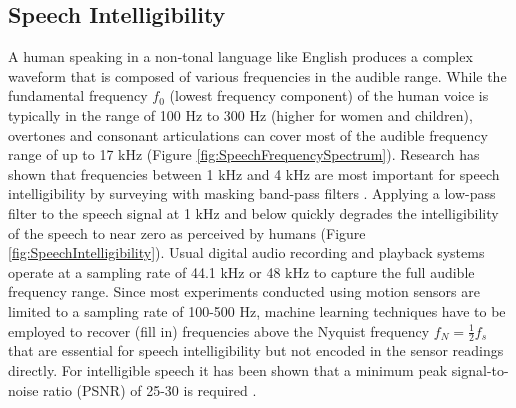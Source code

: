 \documentclass[sigconf, nonacm]{acmart}
\begin{document}
\subsection{Speech Intelligibility}
A human speaking in a non-tonal language like English produces a complex waveform that is composed of various frequencies in the audible range.
While the fundamental frequency $f_0$ (lowest frequency component) of the human voice is typically in the range of 100 Hz to 300 Hz (higher for women and children), overtones and consonant articulations can cover most of the audible frequency range of up to 17 kHz (Figure \ref{fig:SpeechFrequencySpectrum}).
Research has shown that frequencies between 1 kHz and 4 kHz are most important for speech intelligibility by surveying with masking band-pass filters \cite{DPAMicrophonesFactsAboutSpeechIntelligibility}.
Applying a low-pass filter to the speech signal at 1 kHz and below quickly degrades the intelligibility of the speech to near zero as perceived by humans (Figure \ref{fig:SpeechIntelligibility}).
Usual digital audio recording and playback systems operate at a sampling rate of 44.1 kHz or 48 kHz to capture the full audible frequency range.
Since most experiments conducted using motion sensors are limited to a sampling rate of 100-500 Hz, machine learning techniques have to be employed to recover (fill in) frequencies above the Nyquist frequency $f_N = \frac{1}{2}f_s$ that are essential for speech intelligibility but not encoded in the sensor readings directly.
For intelligible speech it has been shown that a minimum peak signal-to-noise ratio (PSNR) of 25-30 is required \cite{DPAMicrophonesFactsAboutSpeechIntelligibility}.
\end{document}
